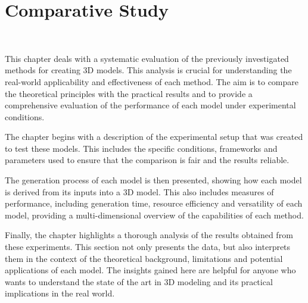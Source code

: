 \chapter{Comparative Study}~\label{ch:comparative study}

This chapter deals with a systematic evaluation of the previously investigated methods for creating 3D models. This analysis is crucial for understanding the real-world applicability and effectiveness of each method. The aim is to compare the theoretical principles with the practical results and to provide a comprehensive evaluation of the performance of each model under experimental conditions.

The chapter begins with a description of the experimental setup that was created to test these models. This includes the specific conditions, frameworks and parameters used to ensure that the comparison is fair and the results reliable. 

The generation process of each model is then presented, showing how each model is derived from its inputs into a 3D model. This also includes measures of performance, including generation time, resource efficiency and versatility of each model, providing a multi-dimensional overview of the capabilities of each method.

Finally, the chapter highlights a thorough analysis of the results obtained from these experiments. This section not only presents the data, but also interprets them in the context of the theoretical background, limitations and potential applications of each model. The insights gained here are helpful for anyone who wants to understand the state of the art in 3D modeling and its practical implications in the real world.



